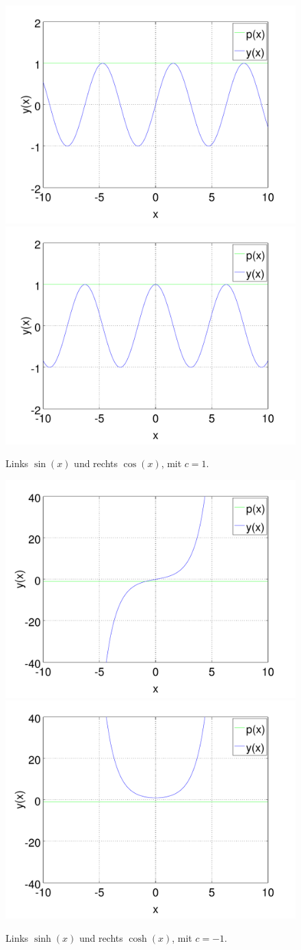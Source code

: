 \begin{figure}
	\includegraphics[width=0.5\hsize]{./wellen/images/basicfunctions/sin.pdf}
	\includegraphics[width=0.5\hsize]{./wellen/images/basicfunctions/cos.pdf}
	\caption{Links $\sin(x)$ und rechts $\cos(x)$, mit $c = 1$.}
	\label{fig:wellen:sin-cos}
\end{figure}

\begin{figure}
	\includegraphics[width=0.5\hsize]{./wellen/images/basicfunctions/sinh.pdf}
	\includegraphics[width=0.5\hsize]{./wellen/images/basicfunctions/cosh.pdf}
	\caption{Links $\sinh(x)$ und rechts $\cosh(x)$, mit $c = -1$.}
	\label{fig:wellen:sinh-cosh}
\end{figure}